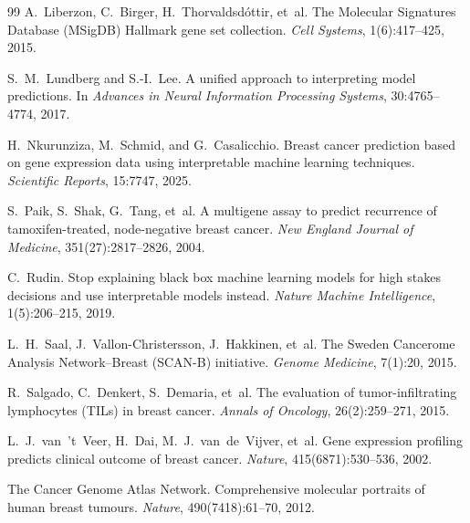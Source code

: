 \documentclass[11pt]{article}
\begin{document}
\begin{thebibliography}{99}
A.~Liberzon, C.~Birger, H.~Thorvaldsd\'{o}ttir, et~al.
\newblock The Molecular Signatures Database (MSigDB) Hallmark gene set collection.
\newblock \textit{Cell Systems}, 1(6):417--425, 2015.

S.~M.~Lundberg and S.-I.~Lee.
\newblock A unified approach to interpreting model predictions.
\newblock In \textit{Advances in Neural Information Processing Systems}, 30:4765--4774, 2017.

H.~Nkurunziza, M.~Schmid, and G.~Casalicchio.
\newblock Breast cancer prediction based on gene expression data using interpretable machine learning techniques.
\newblock \textit{Scientific Reports}, 15:7747, 2025.

S.~Paik, S.~Shak, G.~Tang, et~al.
\newblock A multigene assay to predict recurrence of tamoxifen-treated, node-negative breast cancer.
\newblock \textit{New England Journal of Medicine}, 351(27):2817--2826, 2004.

C.~Rudin.
\newblock Stop explaining black box machine learning models for high stakes decisions and use interpretable models instead.
\newblock \textit{Nature Machine Intelligence}, 1(5):206--215, 2019.

L.~H.~Saal, J.~Vallon-Christersson, J.~Hakkinen, et~al.
\newblock The Sweden Cancerome Analysis Network--Breast (SCAN-B) initiative.
\newblock \textit{Genome Medicine}, 7(1):20, 2015.

R.~Salgado, C.~Denkert, S.~Demaria, et~al.
\newblock The evaluation of tumor-infiltrating lymphocytes (TILs) in breast cancer.
\newblock \textit{Annals of Oncology}, 26(2):259--271, 2015.

L.~J.~van~'t~Veer, H.~Dai, M.~J.~van~de~Vijver, et~al.
\newblock Gene expression profiling predicts clinical outcome of breast cancer.
\newblock \textit{Nature}, 415(6871):530--536, 2002.

The Cancer Genome Atlas Network.
\newblock Comprehensive molecular portraits of human breast tumours.
\newblock \textit{Nature}, 490(7418):61--70, 2012.

\end{thebibliography}
\end{document}
